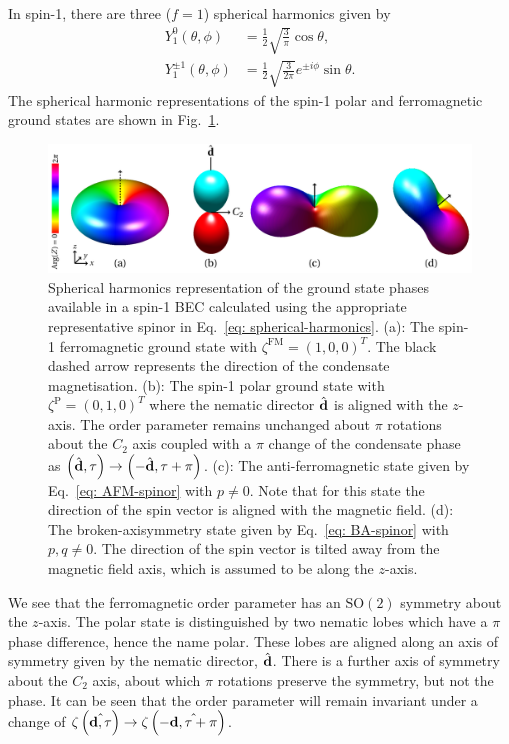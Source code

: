 In spin-1, there are three (\(f = 1\)) spherical harmonics given by
\begin{align}
    Y_1^0(\theta, \phi)       & = \frac{1}{2}\sqrt{\frac{3}{\pi}}\cos\theta, \\
    Y_1^{\pm 1}(\theta, \phi) & =
    \frac{1}{2}\sqrt{\frac{3}{2\pi}}e^{\pm i \phi}\sin\theta.
\end{align}
The spherical harmonic representations of the spin-1 polar and ferromagnetic
ground states are shown in Fig.~\ref{fig: spin-1-spherical-harmonics}.
\begin{figure}
    \includegraphics[width=\textwidth]
    {gfx/ch-groundStateSymmetries/spin-1-ground-states.pdf}
    \caption[Spherical harmonic representation of spin-1 ground states]
    {\label{fig: spin-1-spherical-harmonics}
    Spherical harmonics representation of the ground state phases available in a
    spin-1 BEC calculated using the appropriate representative spinor in
    Eq.~\eqref{eq: spherical-harmonics}.
    (a): The spin-1 ferromagnetic ground state with
    \(\zeta^\mathrm{FM}={(1, 0, 0)}^T\).
    The black dashed arrow represents the direction of the condensate
    magnetisation.
    (b): The spin-1 polar ground state with
    \(\zeta^\mathrm{P}={(0, 1, 0)}^T\) where the nematic director
    \(\hat{\vb{d}}\) is aligned with the \(z\)-axis.
    The order parameter remains unchanged about \(\pi \) rotations about the
    \(C_2\) axis coupled with a \(\pi \) change of the condensate phase as
    \(\left(\hat{\vb{d}}, \tau\right) \rightarrow
    \left(-\hat{\vb{d}}, \tau+\pi\right)\).
    (c): The anti-ferromagnetic state given by Eq.~\eqref{eq: AFM-spinor} with
    \(p \neq 0\).
    Note that for this state the direction of the spin vector is aligned with
    the magnetic field.
    (d): The broken-axisymmetry state given by Eq.~\eqref{eq: BA-spinor} with
    \(p, q \neq 0\).
    The direction of the spin vector is tilted away from the magnetic field
    axis, which is assumed to be along the \(z\)-axis.}
\end{figure}
We see that the ferromagnetic order parameter has an \(\text{SO}(2)\) symmetry
about the \(z\)-axis.
The polar state is distinguished by two nematic lobes which have a \(\pi \)
phase difference, hence the name polar.
These lobes are aligned along an axis of symmetry given by the nematic director,
\(\hat{\vb{d}}\).
There is a further axis of symmetry about the \(C_2\) axis, about which \(\pi \)
rotations preserve the symmetry, but not the phase.
It can be seen that the order parameter will remain invariant under a change of
\(\zeta\left(\hat{\vb{d}, \tau}\right) \rightarrow
\zeta\left(-\hat{\vb{d}, \tau + \pi}\right)\).

